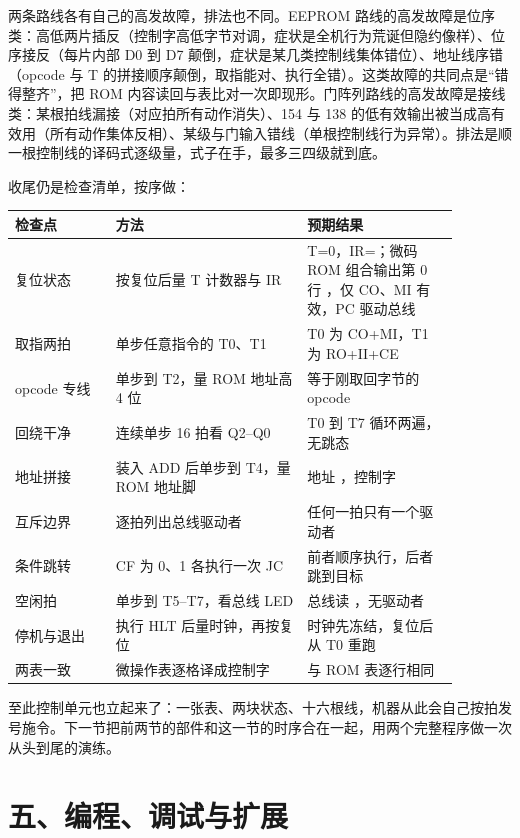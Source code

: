 两条路线各有自己的高发故障，排法也不同。EEPROM 路线的高发故障是位序类：高低两片插反（控制字高低字节对调，症状是全机行为荒诞但隐约像样）、位序接反（每片内部 D0 到 D7 颠倒，症状是某几类控制线集体错位）、地址线序错（opcode 与 T 的拼接顺序颠倒，取指能对、执行全错）。这类故障的共同点是“错得整齐”，把 ROM 内容读回与表比对一次即现形。门阵列路线的高发故障是接线类：某根拍线漏接（对应拍所有动作消失）、154 与 138 的低有效输出被当成高有效用（所有动作集体反相）、某级与门输入错线（单根控制线行为异常）。排法是顺一根控制线的译码式逐级量，式子在手，最多三四级就到底。

收尾仍是检查清单，按序做：

\begin{longtable}{L{0.20\linewidth}L{0.38\linewidth}L{0.30\linewidth}}
\toprule
检查点 & 方法 & 预期结果 \\
\midrule
复位状态 & 按复位后量 T 计数器与 IR & T=0，IR=；微码 ROM 组合输出第 0 行 ，仅 CO、MI 有效，PC 驱动总线 \\
取指两拍 & 单步任意指令的 T0、T1 & T0 为 CO+MI，T1 为 RO+II+CE \\
opcode 专线 & 单步到 T2，量 ROM 地址高 4 位 & 等于刚取回字节的 opcode \\
回绕干净 & 连续单步 16 拍看 Q2–Q0 & T0 到 T7 循环两遍，无跳态 \\
地址拼接 & 装入 ADD 后单步到 T4，量 ROM 地址脚 & 地址 ，控制字  \\
互斥边界 & 逐拍列出总线驱动者 & 任何一拍只有一个驱动者 \\
条件跳转 & CF 为 0、1 各执行一次 JC & 前者顺序执行，后者跳到目标 \\
空闲拍 & 单步到 T5–T7，看总线 LED & 总线读 ，无驱动者 \\
停机与退出 & 执行 HLT 后量时钟，再按复位 & 时钟先冻结，复位后从 T0 重跑 \\
两表一致 & 微操作表逐格译成控制字 & 与 ROM 表逐行相同 \\
\bottomrule
\end{longtable}

至此控制单元也立起来了：一张表、两块状态、十六根线，机器从此会自己按拍发号施令。下一节把前两节的部件和这一节的时序合在一起，用两个完整程序做一次从头到尾的演练。

\section{五、编程、调试与扩展}

